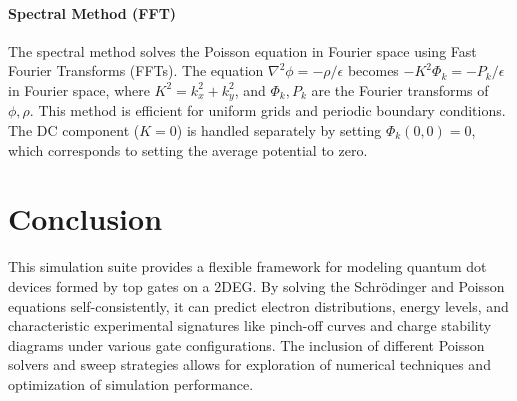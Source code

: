\documentclass{article}
\begin{document}
\paragraph{Spectral Method (FFT)}
The spectral method solves the Poisson equation in Fourier space using Fast Fourier Transforms (FFTs). The equation \(\nabla^2 \phi = -\rho/\epsilon\) becomes \(-K^2 \Phi_k = -P_k/\epsilon\) in Fourier space, where \(K^2 = k_x^2 + k_y^2\), and \(\Phi_k, P_k\) are the Fourier transforms of \(\phi, \rho\). This method is efficient for uniform grids and periodic boundary conditions. The DC component (\(K=0\)) is handled separately by setting \(\Phi_k(0,0)=0\), which corresponds to setting the average potential to zero.

\section{Conclusion}
This simulation suite provides a flexible framework for modeling quantum dot devices formed by top gates on a 2DEG. By solving the Schrödinger and Poisson equations self-consistently, it can predict electron distributions, energy levels, and characteristic experimental signatures like pinch-off curves and charge stability diagrams under various gate configurations. The inclusion of different Poisson solvers and sweep strategies allows for exploration of numerical techniques and optimization of simulation performance.
\end{document}
